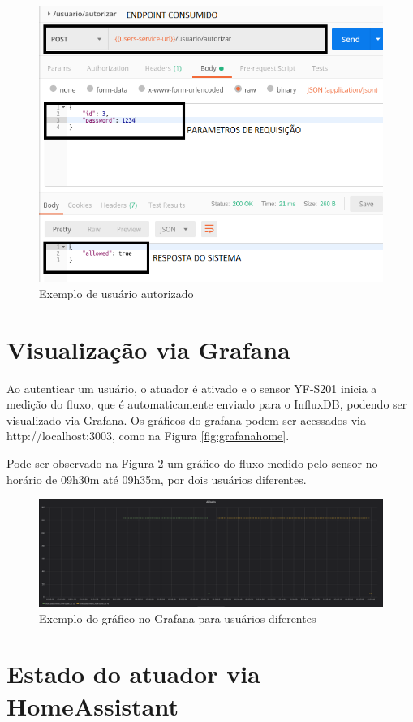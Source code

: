 \begin{figure}[htbp]
	\centering
	\includegraphics[width=0.7\linewidth]{figuras/postman/allowedtrue.png}
	\caption{Exemplo de usuário autorizado}
	\label{fig:allowedtrue}
\end{figure}

\section{Visualização via Grafana}

Ao autenticar um usuário, o atuador é ativado e o sensor YF-S201 inicia a medição do fluxo, que é automaticamente enviado para o InfluxDB, podendo ser visualizado via Grafana. Os gráficos do grafana podem ser acessados via http://localhost:3003, como na Figura \ref{fig:grafanahome}.

Pode ser observado na Figura \ref{fig:grafana-graph} um gráfico do fluxo medido pelo sensor no horário de 09h30m até 09h35m, por dois usuários diferentes.

\begin{figure}[htbp]
	\centering
	\includegraphics[width=1\linewidth]{figuras/grafanagraph.png}
	\caption{Exemplo do gráfico no Grafana para usuários diferentes}
	\label{fig:grafana-graph}
\end{figure}

\section{Estado do atuador via HomeAssistant}

